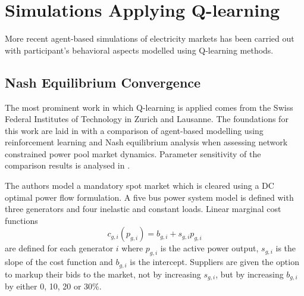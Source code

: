 \section{Simulations Applying Q-learning}
%
More recent agent-based simulations of electricity markets has been carried out
with participant's behavioral aspects modelled using Q-learning methods.

\subsection{Nash Equilibrium Convergence}
The most prominent work in which Q-learning is applied comes from the Swiss
Federal Institutes of Technology in Zurich and Lausanne. The foundations for
this work are laid in  with a comparison of agent-based
modelling using reinforcement learning and Nash equilibrium analysis when
assessing network constrained power pool market dynamics. Parameter sensitivity
of the comparison results is analysed in .

The authors model a mandatory spot market which is cleared using a DC optimal
power flow formulation.  A five bus power system model is defined with three
generators and four inelastic and constant loads.  Linear marginal cost
functions
\begin{equation}
c_{g,i}(p_{g,i}) = b_{g,i} + s_{g,i}p_{g,i}
\end{equation}
are defined for each generator $i$ where $p_{g,i}$ is the active power output,
$s_{g,i}$ is the slope of the cost function and $b_{g,i}$ is the intercept.
Suppliers are given the option to markup their bids to the market, not by
increasing $s_{g,i}$, but by increasing $b_{g,i}$ by either 0, 10, 20 or 30\%.

